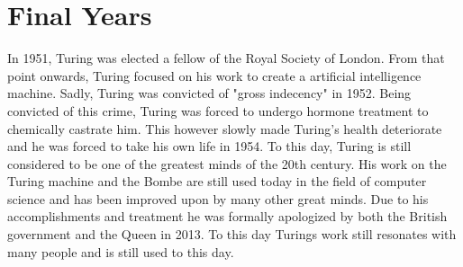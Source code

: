 \documentclass[12pt]{article}
\begin{document}
\section*{Final Years}
In 1951, Turing was elected a fellow of the Royal Society of London.
From that point onwards, Turing focused on his work to create a artificial intelligence machine.
Sadly, Turing was convicted of "gross indecency" in 1952.
Being convicted of this crime, Turing was forced to undergo hormone treatment to chemically castrate him.
This however slowly made Turing's health deteriorate and he was forced to take his own life in 1954.
To this day, Turing is still considered to be one of the greatest minds of the 20th century.
His work on the Turing machine and the Bombe are still used today in the field of computer science and 
has been improved upon by many other great minds.
Due to his accomplishments and treatment he was formally apologized by both the British government and the Queen in 2013.
To this day Turings work still resonates with many people and is still used to this day.

\nocite{*}


\end{document}

